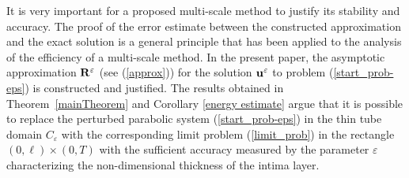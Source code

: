 \documentclass[reqno]{amsart}            %
\numberwithin{equation}{section}
\begin{document}
It is very important for a proposed multi-scale method to justify its stability and accuracy. The proof of the
error estimate between the constructed approximation and the exact solution is a general principle that has been
applied to the analysis of the efficiency of a multi-scale method. In the present paper, the asymptotic
approximation ${\bf R}^\varepsilon$ (see (\ref{approx})) for the solution ${\bf u}^\varepsilon$ to problem (\ref{start_prob-eps}) is constructed and justified. The results obtained in Theorem~\ref{mainTheorem} and Corollary \ref{energy estimate} argue that
 it is possible to replace the perturbed parabolic system (\ref{start_prob-eps}) in the thin tube domain $C_\varepsilon$ with
the corresponding limit problem (\ref{limit_prob})  in the rectangle $(0, \ell)\times (0,T)$ with the sufficient accuracy measured by the parameter $\varepsilon$ characterizing the non-dimensional  thickness of the intima layer.
\end{document}
